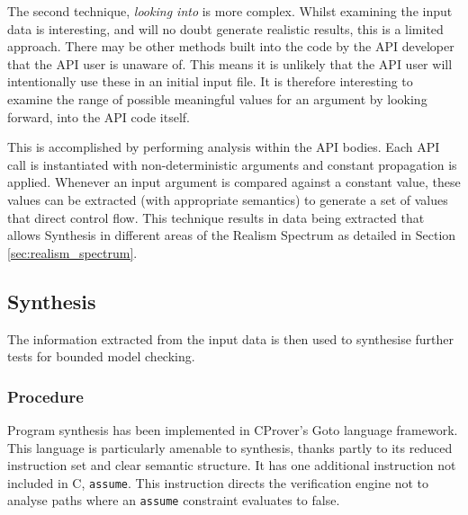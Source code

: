 \documentclass[EPiC]{easychair}
\begin{document}
The second technique, \emph{looking into} is more complex.  Whilst examining the input data is interesting, and will no doubt generate realistic results, this is a limited approach.  There may be other methods built into the code by the API developer that the API user is unaware of.  This means it is unlikely that the API user will intentionally use these in an initial input file.  It is therefore interesting to examine the range of possible meaningful values for an argument by looking forward, into the API code itself.

This is accomplished by performing analysis within the API bodies.  Each API call is instantiated with non-deterministic arguments and constant propagation is applied.  Whenever an input argument is compared against a constant value, these values can be extracted (with appropriate semantics) to generate a set of values that direct control flow.   This technique results in data being extracted that allows Synthesis in different areas of the Realism Spectrum as detailed in Section \ref{sec:realism_spectrum}.

\subsection{Synthesis}
\label{sec:synthesis}
The information extracted from the input data is then used to synthesise further tests for bounded model checking.  


\subsubsection{Procedure}

Program synthesis has been implemented in CProver's Goto language  framework. This language is particularly amenable to synthesis, thanks partly to its reduced instruction set and clear semantic structure.  It has one additional instruction not included in C, \texttt{assume}.  This instruction directs the verification engine not to analyse paths where an \texttt{assume} constraint evaluates to false.
\end{document}
